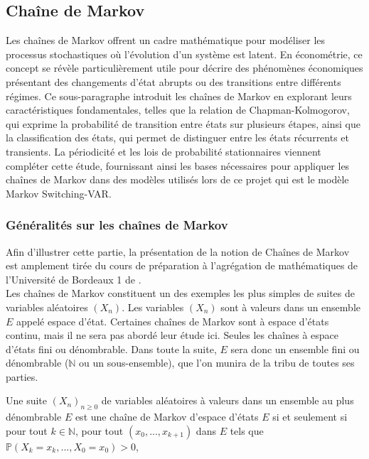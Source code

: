 \begin{sloppypar}
\subsection{Chaîne de Markov}

Les chaînes de Markov offrent un cadre mathématique pour modéliser les processus stochastiques où l’évolution d’un système est latent. En économétrie, ce concept se révèle particulièrement utile pour décrire des phénomènes économiques présentant des changements d’état abrupts ou des transitions entre différents régimes. Ce sous-paragraphe introduit les chaînes de Markov en explorant leurs caractéristiques fondamentales, telles que la relation de Chapman-Kolmogorov, qui exprime la probabilité de transition entre états sur plusieurs étapes, ainsi que la classification des états, qui permet de distinguer entre les états récurrents et transients. La périodicité et les lois de probabilité stationnaires viennent compléter cette étude, fournissant ainsi les bases nécessaires pour appliquer les chaînes de Markov dans des modèles utilisés lors de ce projet qui est le modèle Markov Switching-VAR.

\subsubsection{Généralités sur les chaînes de Markov}
Afin d'illustrer cette partie, la présentation de la notion de Chaînes de Markov est amplement tirée du cours de préparation à l'agrégation de mathématiques de l'Université de Bordeaux 1 de \cite[2013]{Ruch et Chabanol}.\\

Les chaînes de Markov constituent un des exemples les plus simples de suites de variables aléatoires $(X_n)$. 
Les variables $(X_n)$ sont à valeurs dans un ensemble $E$ appelé espace d’état. 
Certaines chaînes de Markov sont à espace d’états continu, mais il ne sera pas abordé leur étude ici. 
Seules les chaînes à espace d’états fini ou dénombrable. 
Dans toute la suite, $E$ sera donc un ensemble fini ou dénombrable ($\mathbb{N}$ ou un sous-ensemble), que l’on munira de la tribu de toutes ses parties. 

\begin{tcolorbox}[colback=blue!5!white,colframe=blue!75!black,title=Définition]
Une suite $(X_n)_{n \geq 0}$ de variables aléatoires à valeurs dans un ensemble au plus dénombrable $E$ est une chaîne de Markov d’espace d’états $E$ si et seulement si pour tout $k \in \mathbb{N}$,
pour tout $(x_0,...,x_{k+1})$ dans $E$ tels que $\mathbb{P}(X_k = x_k,...,X_0 = x_0) > 0$,


\end{tcolorbox}
\end{sloppypar}
